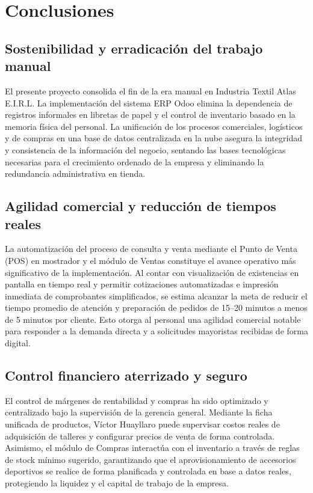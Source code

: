 \section{Conclusiones}

\subsection{Sostenibilidad y erradicación del trabajo manual}
\begin{indentedsubsection}
El presente proyecto consolida el fin de la era manual en Industria Textil Atlas E.I.R.L. La implementación del sistema ERP Odoo elimina la dependencia de registros informales en libretas de papel y el control de inventario basado en la memoria física del personal. La unificación de los procesos comerciales, logísticos y de compras en una base de datos centralizada en la nube asegura la integridad y consistencia de la información del negocio, sentando las bases tecnológicas necesarias para el crecimiento ordenado de la empresa y eliminando la redundancia administrativa en tienda.
\end{indentedsubsection}

\subsection{Agilidad comercial y reducción de tiempos reales}
\begin{indentedsubsection}
La automatización del proceso de consulta y venta mediante el Punto de Venta (POS) en mostrador y el módulo de Ventas constituye el avance operativo más significativo de la implementación. Al contar con visualización de existencias en pantalla en tiempo real y permitir cotizaciones automatizadas e impresión inmediata de comprobantes simplificados, se estima alcanzar la meta de reducir el tiempo promedio de atención y preparación de pedidos de 15--20 minutos a menos de 5 minutos por cliente. Esto otorga al personal una agilidad comercial notable para responder a la demanda directa y a solicitudes mayoristas recibidas de forma digital.
\end{indentedsubsection}

\subsection{Control financiero aterrizado y seguro}
\begin{indentedsubsection}
El control de márgenes de rentabilidad y compras ha sido optimizado y centralizado bajo la supervisión de la gerencia general. Mediante la ficha unificada de productos, Víctor Huayllaro puede supervisar costos reales de adquisición de talleres y configurar precios de venta de forma controlada. Asimismo, el módulo de Compras interactúa con el inventario a través de reglas de stock mínimo sugerido, garantizando que el aprovisionamiento de accesorios deportivos se realice de forma planificada y controlada en base a datos reales, protegiendo la liquidez y el capital de trabajo de la empresa.
\end{indentedsubsection}

